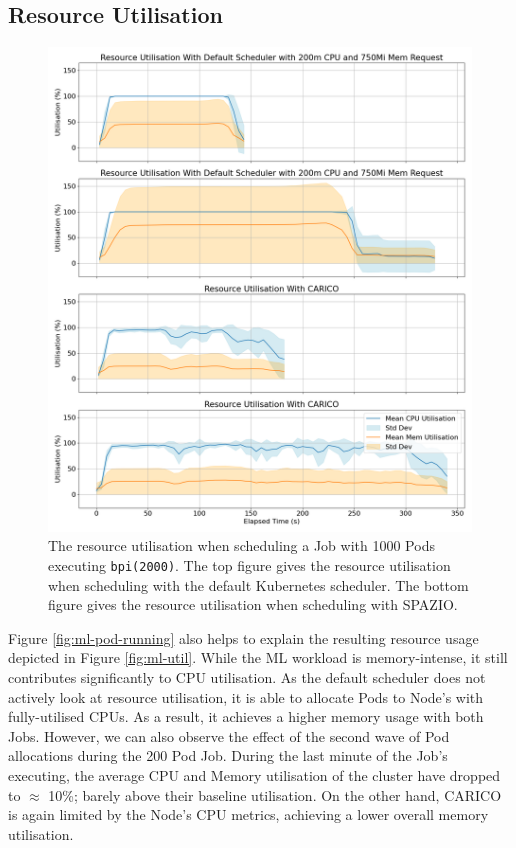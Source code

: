 \subsection{Resource Utilisation}
\begin{figure}[H]
    \centering
    \includegraphics[width=\textwidth]{images/ml-util.png}
    \caption{The resource utilisation when scheduling a Job with 1000 Pods
    executing \texttt{bpi(2000)}. The top figure gives the resource utilisation
    when scheduling with the default Kubernetes scheduler. The bottom figure
    gives the resource utilisation when scheduling with SPAZIO.}
\end{figure}

Figure \ref{fig:ml-pod-running} also helps to explain the resulting resource usage
depicted in Figure \ref{fig:ml-util}. While the ML workload is memory-intense,
it still contributes significantly to CPU utilisation. As the default scheduler
does not actively look at resource utilisation, it is able to allocate Pods to
Node's with fully-utilised CPUs. As a result, it achieves a higher memory usage
with both Jobs. However, we can also observe the effect of the second wave of
Pod allocations during the 200 Pod Job. During the last minute of the Job's
executing, the average CPU and Memory utilisation of the cluster have dropped to
$\approx$ 10\%; barely above their baseline utilisation.
On the other hand, CARICO is again limited by the Node's CPU metrics, achieving
a lower overall memory utilisation.


